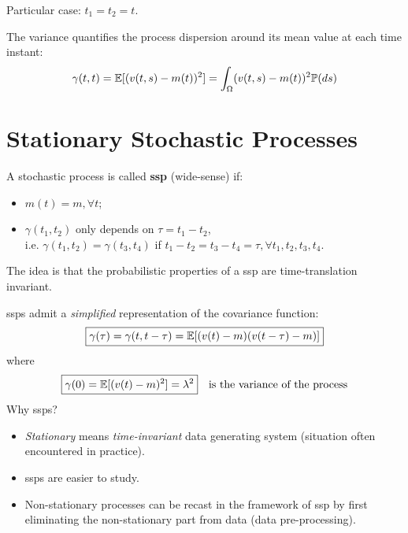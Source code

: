 Particular case: $t_{1}=t_{2}=t$.
\begin{defn}[Variance]
	The variance quantifies the process dispersion around its mean value at each time instant:
	\[
		\gamma(t, t)=\mathbb{E}[(v(t, s)-m(t))^{2}]=\int_{\Omega}(v(t, s)-m(t))^{2} \mathbb{P}(ds)
	\]
\end{defn}

\section{Stationary Stochastic Processes}
\begin{defn}
	A stochastic process is called \textbf{\gls{ssp}} (wide-sense) if:
	\begin{itemize}
		\item $m(t)=m, \forall t$;
		\item $\gamma(t_{1}, t_{2})$ only depends on $\tau=t_{1}-t_{2}$,\\
		i.e. $\gamma(t_{1}, t_{2})=\gamma(t_{3}, t_{4})$ if $t_{1}-t_{2}=t_{3}-t_{4}=\tau, \forall t_{1}, t_{2}, t_{3}, t_{4}$.
	\end{itemize}
\end{defn}
The idea is that the probabilistic properties of a \gls{ssp} are time-translation invariant.

\glspl{ssp} admit a \emph{simplified} representation of the covariance function:
\[
	\boxed{\gamma(\tau)=\gamma(t, t-\tau)=\mathbb{E}[(v(t)-m)(v(t-\tau)-m)]}
\]
where
\[
	\boxed{\gamma(0)=\mathbb{E}[(v(t)-m)^{2}]=\lambda^2} \quad \text{is the variance of the process}
\]
Why \glspl{ssp}?
\begin{itemize}
	\item \emph{Stationary} means \emph{time-invariant} data generating system (situation often encountered in practice).
	\item \glspl{ssp} are easier to study.
	\item Non-stationary processes can be recast in the framework of \gls{ssp} by first eliminating the non-stationary part from data (data pre-processing).
\end{itemize}

